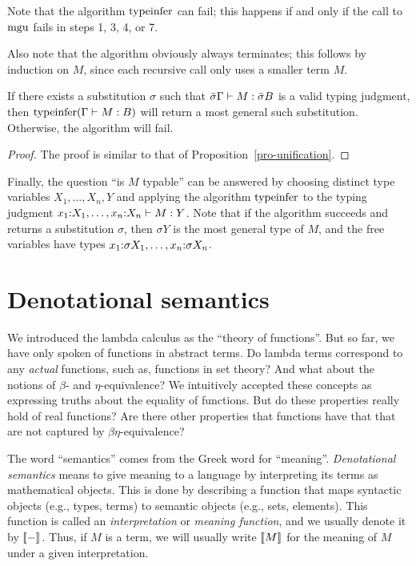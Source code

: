 \documentclass{article}
\begin{document}
Note that the algorithm $\mathop{\rm typeinfer}$ can fail; this happens if and
only if the call to $\mathop{\rm mgu}$ fails in steps 1, 3, 4, or 7.

Also note that the algorithm obviously always terminates; this follows
by induction on $M$, since each recursive call only uses a smaller
term $M$. 

\begin{proposition}
  If there exists a substitution $\sigma$ such that
  $\bar{\sigma}\Gamma\vdash M:\bar{\sigma} B$ is a valid typing judgment, then
  $\mathop{\rm typeinfer} (\Gamma\vdash M: B)$ will return a most general such
  substitution. Otherwise, the algorithm will fail. 
\end{proposition}

\begin{proof}
  The proof is similar to that of Proposition~\ref{pro-unification}.
  \eot
\end{proof}

Finally, the question ``is $M$ typable'' can be answered by choosing
distinct type variables $X_1,\ldots,X_n,Y$ and applying the algorithm
$\mathop{\rm typeinfer}$ to the typing judgment
$x_1{:}X_1,\ldots,x_n{:}X_n\vdash M:Y$. Note that if the
algorithm succeeds and returns a substitution $\sigma$, then $\sigma
Y$ is the most general type of $M$, and the free variables have types
$x_1{:}\sigma X_1,\ldots,x_n{:}\sigma X_n$.

\section{Denotational semantics}\label{sec-set-semantics}

We introduced the lambda calculus as the ``theory of functions''. But
so far, we have only spoken of functions in abstract terms. Do lambda
terms correspond to any {\em actual} functions, such as, functions in
set theory? And what about the notions of $\beta$- and
$\eta$-equivalence?  We intuitively accepted these concepts as
expressing truths about the equality of functions. But do these
properties really hold of real functions? Are there other properties
that functions have that that are not captured by $\beta\eta$-equivalence?

The word ``semantics'' comes from the Greek word for ``meaning''.
{\em Denotational semantics} means to give meaning to a language by
interpreting its terms as mathematical objects. This is done by
describing a function that maps syntactic objects (e.g., types,
terms) to semantic objects (e.g., sets, elements). This function is
called an {\em interpretation} or {\em meaning function}, and we
usually denote it by $[\![-]\!]_{}$. Thus, if $M$ is a term, we will
usually write $[\![M]\!]_{}$ for the meaning of $M$ under a given
interpretation.
\end{document}
